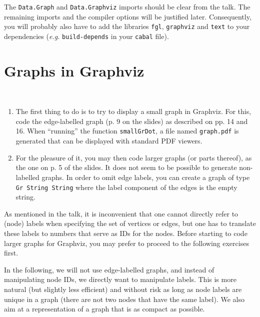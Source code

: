 \documentclass[english]{article}
\begin{document}
The \texttt{Data.Graph} and \texttt{Data.Graphviz} imports should be clear
from the talk. The remaining imports and the compiler options will be
justified later. Consequently, you will probably also have to add the libraries
\texttt{fgl}, \texttt{graphviz} and \texttt{text} to your dependencies
(\emph{e.g.} \texttt{build-depends} in your \texttt{cabal} file).



\section{Graphs in Graphviz}\label{sec:graphviz}

\begin{exo} \
  \begin{enumerate}
  \item The first thing to do is to try to display a small graph in
    Graphviz. For this, code the edge-labelled graph (p. 9 on the slides) as
    described on pp. 14 and 16. When ``running'' the function
    \texttt{smallGrDot}, a file named \texttt{graph.pdf} is generated that can
    be displayed with standard PDF viewers.
  \item For the pleasure of it, you may then code larger graphs (or parts
    thereof),  as the one on p. 5 of the slides. It does not seem to be
    possible to generate non-labelled graphs. In order to omit edge labels,
    you can create a graph of type \texttt{Gr String String} where the label
    component of the edges is the empty string. 
  \end{enumerate}
\end{exo}
As mentioned in the talk, it is inconvenient that one cannot directly refer to
(node) labels when specifying the set of vertices or edges, but one has to
translate these labels to numbers that serve as IDs for the nodes.  Before
starting to code larger graphs for Graphviz, you may prefer to proceed to the
following exercises first.

In the following, we will not use edge-labelled graphs, and instead of
manipulating node IDs, we directly want to manipulate labels. This is more
natural (but slightly less efficient) and without risk as long as node labels
are unique in a graph (there are not two nodes that have the same label). We
also aim at a representation of a graph that is as compact as possible.
\end{document}

